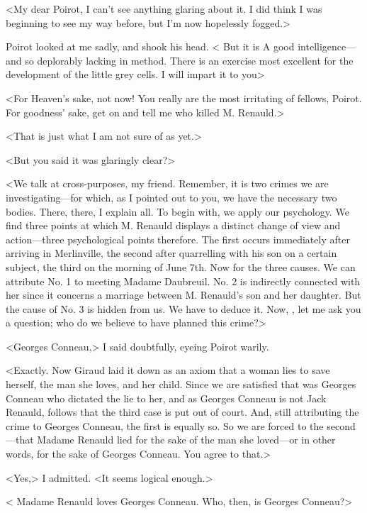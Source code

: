  <My dear Poirot, I can't see anything glaring about it. I did think I was beginning to see my way before, but I'm now hopelessly fogged.> 

 Poirot looked at me sadly, and shook his head. < But it is  A good intelligence—and so deplorably lacking in method. There is an exercise most excellent for the development of the little grey cells. I will impart it to you\longdash> 

 <For Heaven's sake, not now! You really are the most irritating of fellows, Poirot. For goodness' sake, get on and tell me who killed M. Renauld.> 

 <That is just what I am not sure of as yet.> 

 <But you said it was glaringly clear?> 

 <We talk at cross-purposes, my friend. Remember, it is two crimes we are investigating—for which, as I pointed out to you, we have the necessary two bodies. There, there,  I explain all. To begin with, we apply our psychology. We find three points at which M. Renauld displays a distinct change of view and action—three psychological points therefore. The first occurs immediately after arriving in Merlinville, the second after quarrelling with his son on a certain subject, the third on the morning of June 7th. Now for the three causes. We can attribute No. 1 to meeting Madame Daubreuil. No. 2 is indirectly connected with her since it concerns a marriage between M. Renauld's son and her daughter. But the cause of No. 3 is hidden from us. We have to deduce it. Now, , let me ask you a question; who do we believe to have planned this crime?> 

 <Georges Conneau,> I said doubtfully, eyeing Poirot warily. 

 <Exactly. Now Giraud laid it down as an axiom that a woman lies to save herself, the man she loves, and her child. Since we are satisfied that was Georges Conneau who dictated the lie to her, and as Georges Conneau is not Jack Renauld, follows that the third case is put out of court. And, still attributing the crime to Georges Conneau, the first is equally so. So we are forced to the second—that Madame Renauld lied for the sake of the man she loved—or in other words, for the sake of Georges Conneau. You agree to that.> 

 <Yes,> I admitted. <It seems logical enough.> 

 < Madame Renauld loves Georges Conneau. Who, then, is Georges Conneau?> 

